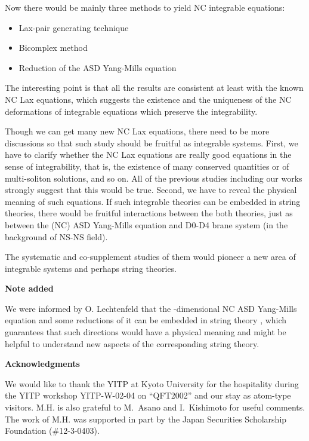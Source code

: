 \documentclass[a4paper,12pt]{article}\setlength{\topmargin}{-1cm}
\begin{document}
Now there would be mainly three methods to yield NC integrable
equations:
\begin{itemize}
\item Lax-pair generating technique
\item Bicomplex method
\item Reduction of the ASD Yang-Mills equation
\end{itemize}
The interesting point is that 
all the results are consistent
at least with the known NC Lax equations, 
which suggests the existence and 
the uniqueness of the NC deformations of integrable equations
which preserve the integrability.

Though we can get many new NC Lax equations,
there need to be more discussions so that
such study should be fruitful as integrable systems.
First, we have to clarify whether the NC Lax equations
are really good equations in the sense of integrability, that is,
the existence of many conserved quantities or
of multi-soliton solutions, and so on.
All of the previous studies including our works
strongly suggest that this would be true.
Second, we have to reveal the physical meaning of such equations.
If such integrable theories can be embedded in string
theories, there would be fruitful interactions
between the both theories,
just as between the (NC) ASD Yang-Mills equation and
D0-D4 brane system (in the background of NS-NS \coordHE{} field).

The systematic and co-supplement studies of them would
pioneer a new area of integrable systems and 
perhaps string theories.

\vskip5mm\noindent
{\bf Note added}
\vskip2mm

\noindent
We were informed by O. Lechtenfeld 
that the \coordHE{}-dimensional NC ASD Yang-Mills equation and
some reductions of it can be embedded \cite{LPS, LePo}
in \coordHE{} string theory \cite{OoVa},
which guarantees that such directions would have a physical
meaning and might be helpful to understand new aspects of 
the corresponding string theory.

\vskip7mm\noindent
{\bf Acknowledgments}
\vskip2mm

\noindent
We would like to thank the YITP at Kyoto University 
for the hospitality during the YITP
workshop YITP-W-02-04 on ``QFT2002''
and our stay as atom-type visitors.
M.H. is also grateful to M.~Asano and I.~Kishimoto for useful comments.
The work of M.H. was supported in part 
by the Japan Securities Scholarship Foundation (\#12-3-0403).
\end{document}
